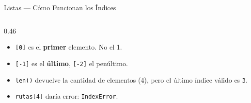 \documentclass[aspectratio=169, 11pt]{beamer}
\begin{document}
\begin{frame}[fragile,shrink=30]{Listas --- Cómo Funcionan los Índices}
\begin{columns}[T]
    \begin{column}{0.46\textwidth}
      {\footnotesize\color{textMuted}
      \begin{itemize}\setlength{\itemsep}{4pt}
        \item[{\color{arcaRed}\scriptsize\faArrowRight}]
          \texttt{[0]} es el \textbf{primer} elemento.
          No el 1.
        \item[{\color{arcaRed}\scriptsize\faArrowRight}]
          \texttt{[-1]} es el \textbf{último},
          \texttt{[-2]} el penúltimo.
        \item[{\color{arcaRed}\scriptsize\faArrowRight}]
          \texttt{len()} devuelve la cantidad
          de elementos (4), pero el último
          índice válido es \texttt{3}.
        \item[{\color{arcaRed}\scriptsize\faArrowRight}]
          \texttt{rutas[4]} daría error:
          \texttt{IndexError}.
      \end{itemize}
      }
    \end{column}
  \end{columns}
\end{frame}
\end{document}
